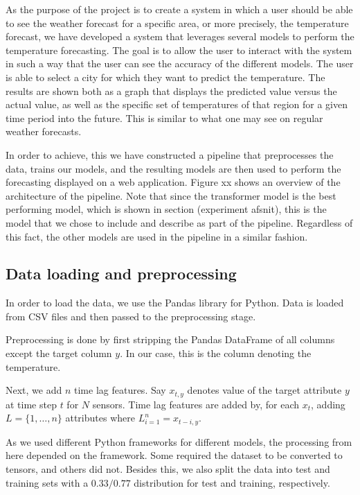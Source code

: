 As the purpose of the project is to create a system in which a user should be able to see the weather forecast for a specific area, or more precisely, the temperature forecast, we have developed a system that leverages several models to perform the temperature forecasting. 
The goal is to allow the user to interact with the system in such a way that the user can see the accuracy of the different models. 
The user is able to select a city for which they want to predict the temperature. The results are shown both as a graph that displays the predicted value versus the actual value, as well as the specific set of temperatures of that region for a given time period into the future. This is similar to what one may see on regular weather forecasts.

In order to achieve, this we have constructed a pipeline that preprocesses the data, trains our models, and the resulting models are then used to perform the forecasting displayed on a web application. 
Figure xx shows an overview of the architecture of the pipeline.
Note that since the transformer model is the best performing model, which is shown in section (experiment afsnit), this is the model that we chose to include and describe as part of the pipeline. Regardless of this fact, the other models are used in the pipeline in a similar fashion.

\subsection{Data loading and preprocessing}
In order to load the data, we use the Pandas library for Python.
Data is loaded from CSV files and then passed to the preprocessing stage.

Preprocessing is done by first stripping the Pandas DataFrame of all columns except the target column $y$. In our case, this is the column denoting the temperature.

Next, we add $n$ time lag features. Say $x_{t,y}$ denotes value of the target attribute $y$ at time step $t$ for $N$ sensors. Time lag features are added by, for each $x_{t}$, adding $L=\{1,\dots, n\}$ attributes where $L_{i=1}^n=x_{t-i, y}$.

As we used different Python frameworks for different models, the processing from here depended on the framework. Some required the dataset to be converted to tensors, and others did not.
Besides this, we also split the data into test and training sets with a $0.33/0.77$ distribution for test and training, respectively.

